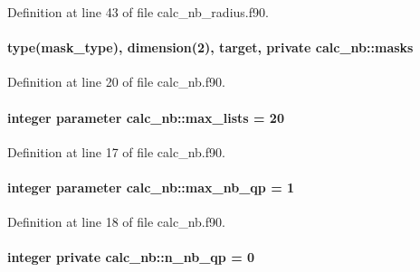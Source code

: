 Definition at line 43 of file calc\-\_\-nb\-\_\-radius.\-f90.

\hypertarget{classcalc__nb_a0fc3fbf8b087c068aa67046a251575ff}{
\paragraph[{masks}]{\setlength{\rightskip}{0pt plus 5cm}type(mask\-\_\-type), dimension(2), target, private calc\-\_\-nb\-::masks\hspace{0.3cm}{\ttfamily [private]}}}\label{classcalc__nb_a0fc3fbf8b087c068aa67046a251575ff}


Definition at line 20 of file calc\-\_\-nb.\-f90.

\hypertarget{classcalc__nb_a7608a4a45c4aa5ef92f94d77f1f5e48a}{
\paragraph[{max\-\_\-lists}]{\setlength{\rightskip}{0pt plus 5cm}integer parameter calc\-\_\-nb\-::max\-\_\-lists = 20}}\label{classcalc__nb_a7608a4a45c4aa5ef92f94d77f1f5e48a}


Definition at line 17 of file calc\-\_\-nb.\-f90.

\hypertarget{classcalc__nb_a7c528e28ccdf3d8e12a25c6e41456704}{
\paragraph[{max\-\_\-nb\-\_\-qp}]{\setlength{\rightskip}{0pt plus 5cm}integer parameter calc\-\_\-nb\-::max\-\_\-nb\-\_\-qp = 1}}\label{classcalc__nb_a7c528e28ccdf3d8e12a25c6e41456704}


Definition at line 18 of file calc\-\_\-nb.\-f90.

\hypertarget{classcalc__nb_ac24ad37a8d5b587e2014a9f637a63a75}{
\paragraph[{n\-\_\-nb\-\_\-qp}]{\setlength{\rightskip}{0pt plus 5cm}integer private calc\-\_\-nb\-::n\-\_\-nb\-\_\-qp = 0\hspace{0.3cm}{\ttfamily [private]}}}\label{classcalc__nb_ac24ad37a8d5b587e2014a9f637a63a75}


